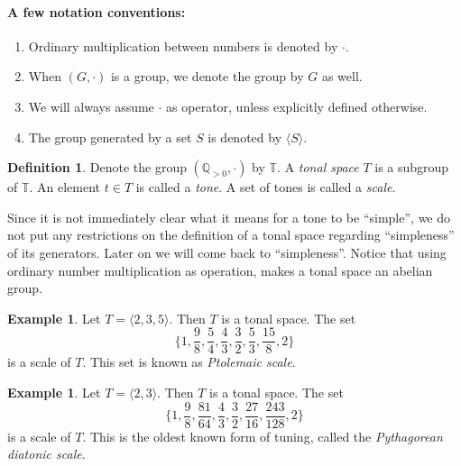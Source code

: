 \documentclass[a4paper]{book}
\theoremstyle{definition}
\newtheorem{definition}[theorem]{Definition}
\newtheorem{example}[theorem]{Example}
\begin{document}
\newcommand{\gen}[1]{\langle #1 \rangle}

\paragraph{A few notation conventions:}
\begin{enumerate}[i]
	\item 
		Ordinary multiplication between numbers is denoted by $\cdot$.
	\item 
		When $(G, \cdot)$ is a group, we denote the group by $G$ as well.
    \item
        We will always assume $\cdot$ as operator, unless explicitly defined otherwise.
    \item
        The group generated by a set $S$ is denoted by $\gen{S}$.
\end{enumerate}

\newcommand{\Q}{\mathbb{T}}%
\newcommand{\R}{\mathbb{R}_{> 0}}
\newcommand{\T}{\mathbb{T}}

\begin{definition}
    Denote the group $(\mathbb{Q}_{> 0}, \cdot)$ by $\Q$.
	A \emph{tonal space} $T$ is a subgroup of $\Q$.
    An element $t \in T$ is called a \emph{tone}.
    A set of tones is called a \emph{scale}.
\end{definition}

Since it is not immediately clear what it means for a tone to be ``simple'', we do not put any restrictions on the definition of a tonal space regarding ``simpleness'' of its generators.
Later on we will come back to ``simpleness''.
Notice that using ordinary number multiplication as operation, makes a tonal space an abelian group.

\begin{example}
    \label{ptolemaic_sequence}
    Let $T = \gen{2,3,5}$.
    Then $T$ is a tonal space.
    The set \[\{1,\frac{9}{8},\frac{5}{4},\frac{4}{3},\frac{3}{2},\frac{5}{3},\frac{15}{8},2\}\] is a scale of $T$.
    This set is known as \emph{Ptolemaic scale}.
\end{example}

\begin{example}
    Let $T = \gen{2,3}$.
    Then $T$ is a tonal space.
    The set \[\{1,\frac{9}{8},\frac{81}{64},\frac{4}{3},\frac{3}{2},\frac{27}{16},\frac{243}{128},2\}\] is a scale of $T$.
    This is the oldest known form of tuning, called the \emph{Pythagorean diatonic scale}.
\end{example}
\end{document}
